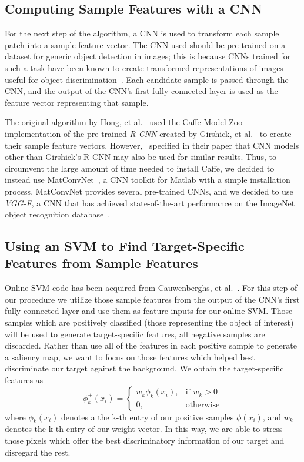 \documentclass{sig-alternate-05-2015}
\begin{document}
\subsection{Computing Sample Features with a CNN}
For the next step of the algorithm, a CNN is used to transform each sample patch into a sample feature vector.
The CNN used should be pre-trained on a dataset for generic object detection in images; this is because CNNs trained for such a task have been known to create transformed representations of images useful for object discrimination~\cite{krizhevsky2012imagenet}.
Each candidate sample is passed through the CNN, and the output of the CNN's first fully-connected layer is used as the feature vector representing that sample.

The original algorithm by Hong, et al.~\cite{hong2015online} used the Caffe Model Zoo implementation of the pre-trained \textit{R-CNN} created by Girshick, et al.~\cite{girshick2016region} to create their sample feature vectors.
However,~\cite{hong2015online} specified in their paper that CNN models other than Girshick's R-CNN may also be used for similar results.
Thus, to circumvent the large amount of time needed to install Caffe, we decided to instead use MatConvNet~\cite{vedaldi2015matconvnet}, a CNN toolkit for Matlab with a simple installation process.
MatConvNet provides several pre-trained CNNs, and we decided to use \textit{VGG-F}, a CNN that has achieved state-of-the-art performance on the ImageNet object recognition database~\cite{chatfield2014return}.

\subsection{Using an SVM to Find Target-Specific Features from Sample Features}
Online SVM code has been acquired from Cauwenberghs, et al.~\cite{cauwenberghs2001incremental}. For this step of our procedure we utilize those sample features from the output of the CNN's first fully-connected layer and use them as feature inputs for our online SVM. Those samples which are positively classified (those representing the object of interest) will be used to generate target-specific features, all negative samples are discarded. Rather than use all of the features in each positive sample to generate a saliency map, we want to focus on those features which helped best discriminate our target against the background. We obtain the target-specific features as\newline
\[\phi_k^+(x_i) = 
\begin{cases}
w_k\phi_k(x_i),& \text{if } w_k > 0\\
0, 			   & \text{otherwise}
\end{cases}
\]  \newline
where $\phi_k(x_i)$ denotes a the k-th entry of our positive samples $\phi(x_i)$, and $w_k$ denotes the k-th entry of our weight vector. In this way, we are able to stress those pixels which offer the best discriminatory information of our target and disregard the rest. 
\end{document}
